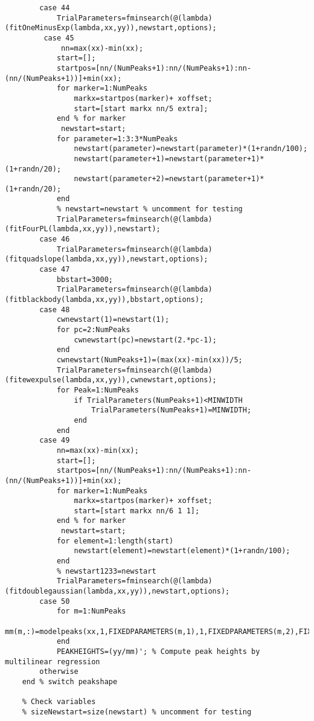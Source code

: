 \begin{lstlisting}
        case 44
            TrialParameters=fminsearch(@(lambda)(fitOneMinusExp(lambda,xx,yy)),newstart,options);
         case 45
             nn=max(xx)-min(xx);
            start=[];
            startpos=[nn/(NumPeaks+1):nn/(NumPeaks+1):nn-(nn/(NumPeaks+1))]+min(xx);
            for marker=1:NumPeaks
                markx=startpos(marker)+ xoffset;
                start=[start markx nn/5 extra];
            end % for marker
             newstart=start;
            for parameter=1:3:3*NumPeaks
                newstart(parameter)=newstart(parameter)*(1+randn/100);
                newstart(parameter+1)=newstart(parameter+1)*(1+randn/20);
                newstart(parameter+2)=newstart(parameter+1)*(1+randn/20);
            end
            % newstart=newstart % uncomment for testing
            TrialParameters=fminsearch(@(lambda)(fitFourPL(lambda,xx,yy)),newstart);
        case 46
            TrialParameters=fminsearch(@(lambda)(fitquadslope(lambda,xx,yy)),newstart,options);
        case 47
            bbstart=3000;
            TrialParameters=fminsearch(@(lambda)(fitblackbody(lambda,xx,yy)),bbstart,options);
        case 48
            cwnewstart(1)=newstart(1);
            for pc=2:NumPeaks
                cwnewstart(pc)=newstart(2.*pc-1);
            end
            cwnewstart(NumPeaks+1)=(max(xx)-min(xx))/5;
            TrialParameters=fminsearch(@(lambda)(fitewexpulse(lambda,xx,yy)),cwnewstart,options);
            for Peak=1:NumPeaks
                if TrialParameters(NumPeaks+1)<MINWIDTH
                    TrialParameters(NumPeaks+1)=MINWIDTH;
                end
            end
        case 49
            nn=max(xx)-min(xx);
            start=[];
            startpos=[nn/(NumPeaks+1):nn/(NumPeaks+1):nn-(nn/(NumPeaks+1))]+min(xx);
            for marker=1:NumPeaks
                markx=startpos(marker)+ xoffset;
                start=[start markx nn/6 1 1];
            end % for marker
             newstart=start;
            for element=1:length(start)
                newstart(element)=newstart(element)*(1+randn/100);
            end
            % newstart1233=newstart
            TrialParameters=fminsearch(@(lambda)(fitdoublegaussian(lambda,xx,yy)),newstart,options);
        case 50
            for m=1:NumPeaks
                mm(m,:)=modelpeaks(xx,1,FIXEDPARAMETERS(m,1),1,FIXEDPARAMETERS(m,2),FIXEDPARAMETERS(m,3));
            end
            PEAKHEIGHTS=(yy/mm)'; % Compute peak heights by multilinear regression
        otherwise
    end % switch peakshape

    % Check variables
    % sizeNewstart=size(newstart) % uncomment for testing
  

\end{lstlisting}
